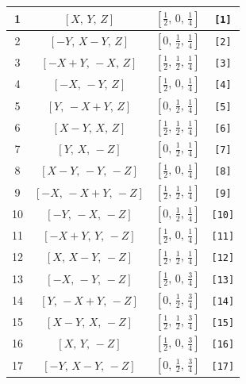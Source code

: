 \documentclass[fleqn,8pt]{jsarticle}
\begin{document}
\begin{longtable}{cccc}
1 & $\left[ X,\, Y,\, Z \right]$ & $\left[ \frac{1}{2},\, 0,\, \frac{1}{4} \right]$ & {\tt [1]} \\ \hline
2 & $\left[ - Y,\, X - Y,\, Z \right]$ & $\left[ 0,\, \frac{1}{2},\, \frac{1}{4} \right]$ & {\tt [2]} \\ \hline
3 & $\left[ - X + Y,\, - X,\, Z \right]$ & $\left[ \frac{1}{2},\, \frac{1}{2},\, \frac{1}{4} \right]$ & {\tt [3]} \\ \hline
4 & $\left[ - X,\, - Y,\, Z \right]$ & $\left[ \frac{1}{2},\, 0,\, \frac{1}{4} \right]$ & {\tt [4]} \\ \hline
5 & $\left[ Y,\, - X + Y,\, Z \right]$ & $\left[ 0,\, \frac{1}{2},\, \frac{1}{4} \right]$ & {\tt [5]} \\ \hline
6 & $\left[ X - Y,\, X,\, Z \right]$ & $\left[ \frac{1}{2},\, \frac{1}{2},\, \frac{1}{4} \right]$ & {\tt [6]} \\ \hline
7 & $\left[ Y,\, X,\, - Z \right]$ & $\left[ 0,\, \frac{1}{2},\, \frac{1}{4} \right]$ & {\tt [7]} \\ \hline
8 & $\left[ X - Y,\, - Y,\, - Z \right]$ & $\left[ \frac{1}{2},\, 0,\, \frac{1}{4} \right]$ & {\tt [8]} \\ \hline
9 & $\left[ - X,\, - X + Y,\, - Z \right]$ & $\left[ \frac{1}{2},\, \frac{1}{2},\, \frac{1}{4} \right]$ & {\tt [9]} \\ \hline
10 & $\left[ - Y,\, - X,\, - Z \right]$ & $\left[ 0,\, \frac{1}{2},\, \frac{1}{4} \right]$ & {\tt [10]} \\ \hline
11 & $\left[ - X + Y,\, Y,\, - Z \right]$ & $\left[ \frac{1}{2},\, 0,\, \frac{1}{4} \right]$ & {\tt [11]} \\ \hline
12 & $\left[ X,\, X - Y,\, - Z \right]$ & $\left[ \frac{1}{2},\, \frac{1}{2},\, \frac{1}{4} \right]$ & {\tt [12]} \\ \hline
13 & $\left[ - X,\, - Y,\, - Z \right]$ & $\left[ \frac{1}{2},\, 0,\, \frac{3}{4} \right]$ & {\tt [13]} \\ \hline
14 & $\left[ Y,\, - X + Y,\, - Z \right]$ & $\left[ 0,\, \frac{1}{2},\, \frac{3}{4} \right]$ & {\tt [14]} \\ \hline
15 & $\left[ X - Y,\, X,\, - Z \right]$ & $\left[ \frac{1}{2},\, \frac{1}{2},\, \frac{3}{4} \right]$ & {\tt [15]} \\ \hline
16 & $\left[ X,\, Y,\, - Z \right]$ & $\left[ \frac{1}{2},\, 0,\, \frac{3}{4} \right]$ & {\tt [16]} \\ \hline
17 & $\left[ - Y,\, X - Y,\, - Z \right]$ & $\left[ 0,\, \frac{1}{2},\, \frac{3}{4} \right]$ & {\tt [17]} \\ \hline

\end{longtable}
\end{document}
